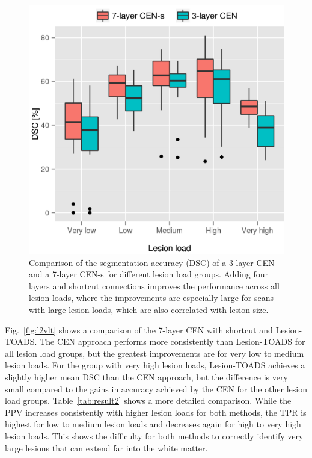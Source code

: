 \begin{figure}[tb]
\centering
\includegraphics[width=\columnwidth]{figures/TMI_boxplot_L1vsL2}

\caption[Comparison of the segmentation accuracy of a 3-layer CEN and a
7-layer CEN-s for different lesion load groups]{Comparison of the segmentation
accuracy (DSC) of a 3-layer CEN and a 7-layer CEN-s for different lesion load groups. Adding four layers and
shortcut connections improves the performance across all lesion loads, where the
improvements are especially large for scans with large lesion loads, which are
also correlated with lesion size.}

\label{fig:l1vl2}
\end{figure}


Fig.~\ref{fig:l2vlt} shows a comparison of the 7-layer CEN with shortcut and
Lesion-TOADS. The CEN approach performs more consistently than Lesion-TOADS for
all lesion load groups, but the greatest improvements are for very low to medium
lesion loads. For the group with very high lesion loads, Lesion-TOADS achieves a
slightly higher mean DSC than the CEN approach, but the difference is very small
compared to the gains in accuracy achieved by the CEN for the other lesion load
groups.
Table~\ref{tab:result2} shows a more detailed
comparison. While the PPV increases consistently with higher lesion loads for
both methods, the TPR is highest for low to medium lesion loads and decreases
again for high to very high lesion loads. This shows the difficulty for both
methods to correctly identify very large lesions that can extend far into the
white matter.

